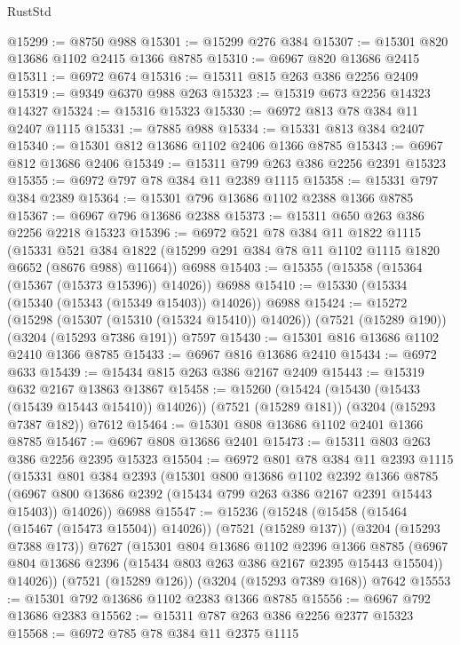 \begin{lexlean}{RustStd}
\begin{coremodule}
@15299 := @8750 @988
@15301 := @15299 @276 @384
@15307 := @15301 @820 @13686 @1102 @2415 @1366 @8785
@15310 := @6967 @820 @13686 @2415
@15311 := @6972 @674
@15316 := @15311 @815 @263 @386 @2256 @2409
@15319 := @9349 @6370 @988 @263
@15323 := @15319 @673 @2256 @14323 @14327
@15324 := @15316 @15323
@15330 := @6972 @813 @78 @384 @11 @2407 @1115
@15331 := @7885 @988
@15334 := @15331 @813 @384 @2407
@15340 := @15301 @812 @13686 @1102 @2406 @1366 @8785
@15343 := @6967 @812 @13686 @2406
@15349 := @15311 @799 @263 @386 @2256 @2391 @15323
@15355 := @6972 @797 @78 @384 @11 @2389 @1115
@15358 := @15331 @797 @384 @2389
@15364 := @15301 @796 @13686 @1102 @2388 @1366 @8785
@15367 := @6967 @796 @13686 @2388
@15373 := @15311 @650 @263 @386 @2256 @2218 @15323
@15396 := @6972
    @521
    @78
    @384
    @11
    @1822
    @1115
    (@15331 @521 @384 @1822 (@15299 @291 @384 @78 @11 @1102 @1115 @1820 @6652 (@8676 @988) @11664))
    @6988
@15403 := @15355 (@15358 (@15364 (@15367 (@15373 @15396)) @14026)) @6988
@15410 := @15330 (@15334 (@15340 (@15343 (@15349 @15403)) @14026)) @6988
@15424 := @15272
    (@15298 (@15307 (@15310 (@15324 @15410)) @14026))
    (@7521 (@15289 @190))
    (@3204 (@15293 @7386 @191))
    @7597
@15430 := @15301 @816 @13686 @1102 @2410 @1366 @8785
@15433 := @6967 @816 @13686 @2410
@15434 := @6972 @633
@15439 := @15434 @815 @263 @386 @2167 @2409
@15443 := @15319 @632 @2167 @13863 @13867
@15458 := @15260
    (@15424 (@15430 (@15433 (@15439 @15443 @15410)) @14026))
    (@7521 (@15289 @181))
    (@3204 (@15293 @7387 @182))
    @7612
@15464 := @15301 @808 @13686 @1102 @2401 @1366 @8785
@15467 := @6967 @808 @13686 @2401
@15473 := @15311 @803 @263 @386 @2256 @2395 @15323
@15504 := @6972
    @801
    @78
    @384
    @11
    @2393
    @1115
    (@15331
      @801
      @384
      @2393
      (@15301
        @800
        @13686
        @1102
        @2392
        @1366
        @8785
        (@6967 @800 @13686 @2392 (@15434 @799 @263 @386 @2167 @2391 @15443 @15403))
        @14026))
    @6988
@15547 := @15236
    (@15248
      (@15458 (@15464 (@15467 (@15473 @15504)) @14026))
      (@7521 (@15289 @137))
      (@3204 (@15293 @7388 @173))
      @7627
      (@15301
        @804
        @13686
        @1102
        @2396
        @1366
        @8785
        (@6967 @804 @13686 @2396 (@15434 @803 @263 @386 @2167 @2395 @15443 @15504))
        @14026))
    (@7521 (@15289 @126))
    (@3204 (@15293 @7389 @168))
    @7642
@15553 := @15301 @792 @13686 @1102 @2383 @1366 @8785
@15556 := @6967 @792 @13686 @2383
@15562 := @15311 @787 @263 @386 @2256 @2377 @15323
@15568 := @6972 @785 @78 @384 @11 @2375 @1115

\end{coremodule}
\end{lexlean}
